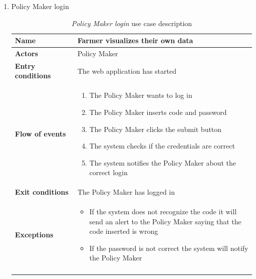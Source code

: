 \begin{enumerate}
    \item Policy Maker login
    \begin{longtable}{p{0.26\linewidth}p{0.75\linewidth}}
        \toprule
        \textbf{Name} & \textbf{Farmer visualizes their own data} \\
        \midrule
        \textbf{Actors} & Policy Maker \\
        \midrule
        \textbf{Entry conditions} & The web application has started\\
        \midrule
        \textbf{Flow of events} & 
        \begin{enumerate}
            \item The Policy Maker wants to log in 
            \item The Policy Maker inserts code and password
            \item The Policy Maker clicks the submit button
            \item The system checks if the credentials are correct
            \item The system notifies the Policy Maker about the correct login
        \end{enumerate} \\
        \midrule
        \textbf{Exit conditions} & The Policy Maker has logged in\\
        \midrule
        \textbf{Exceptions} & 
        \begin{itemize}
            \item If the system does not recognize the code it will send an alert  to the Policy Maker saying that the code inserted is wrong
            \item If the password is not correct the system will notify the Policy Maker 
        \end{itemize}\\
        \bottomrule
        \caption{\emph{Policy Maker login} use case description}
    \end{longtable}
    \begin{figure}[H]
        \begin{center}

\end{center}
\end{figure}
\end{enumerate}
